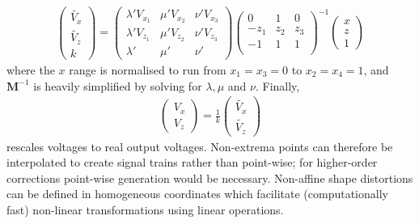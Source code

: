 \begin{align}
\begin{pmatrix}
\widetilde{V_x}  \\
\widetilde{V_z} \\
k
\end{pmatrix}=\begin{pmatrix}
 \lambda' V_{x_1} &  \mu'V_{x_2} &  \nu' V_{x_3} \\
 \lambda' V_{z_1} &  \mu'V_{z_2} &  \nu' V_{z_3} \\
 \lambda' & \mu'  & \nu'
\end{pmatrix}
\begin{pmatrix}
    0 & 1 & 0 \\
    -z_1 & z_2 & z_3 \\
    -1 & 1 & 1 \\
  \end{pmatrix}^{-1}
\begin{pmatrix}
x  \\
z \\
1
\end{pmatrix}
\end{align}
where the $x$ range is normalised to run from $x_1 = x_3 = 0$ to $x_2 =x_4=1$, and $\textbf{M}^{-1}$ is heavily simplified by solving for $ \lambda, \mu$ and $\nu$.
Finally,
\begin{align}
\begin{pmatrix}
V_x  \\
V_z
\end{pmatrix} =
\frac{1}{k}
\begin{pmatrix}
\widetilde{V_x}  \\
\widetilde{V_z}
\end{pmatrix}
\end{align}
rescales  voltages to real output voltages.
Non-extrema points can therefore be interpolated to create signal trains rather than point-wise; for higher-order corrections point-wise generation would be necessary.
\if
Non-affine shape distortions can be defined in \gls{homogeneous coordinates} which facilitate (computationally fast) %
non-linear transformations using linear operations.
